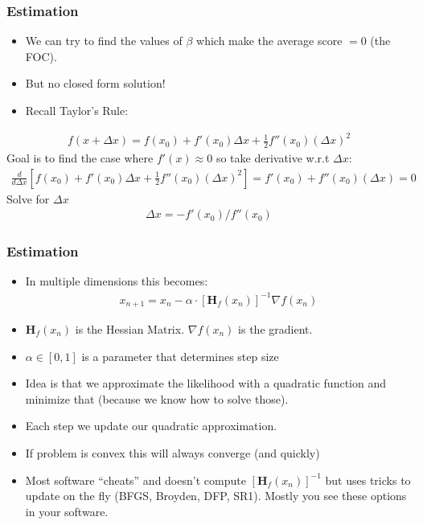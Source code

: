 \begin{frame}
\frametitle{Estimation}
\begin{itemize} 
\item We can try to find the values of $\beta$ which make the average score $=0$ (the FOC).
\item But no closed form solution!
\item Recall Taylor's Rule:
\end{itemize}
\begin{eqnarray*}
f(x + \Delta x) =  f(x_0) + f'(x_0) \Delta x + \frac{1}{2} f''(x_0) (\Delta x)^2
\end{eqnarray*}
Goal is to find the case where $f'(x) \approx 0$ so take derivative w.r.t $\Delta x$:
\begin{eqnarray*}
\frac{d}{d \Delta x} \left[  f(x_0) + f'(x_0) \Delta x + \frac{1}{2} f''(x_0) (\Delta x)^2 \right] = f'(x_0) +  f''(x_0) (\Delta x) = 0
\end{eqnarray*}
Solve for $\Delta x$
\begin{eqnarray*}
\Delta x  = - f'(x_0) / f''(x_0)
\end{eqnarray*}
\end{frame}



\begin{frame}
\frametitle{Estimation}
\begin{itemize} 
\item In multiple dimensions this becomes:
\begin{eqnarray*}
x_{n+1} = x_{n} - \alpha \cdot \left[\mathbf{H}_f (x_n) \right]^{-1} \nabla f(x_n)
\end{eqnarray*}
\item $\mathbf{H}_f (x_n)$ is the \alert{Hessian} Matrix. $ \nabla f(x_n)$ is the \alert{gradient}.
\item $\alpha \in [0,1]$ is a parameter that determines \alert{step size}
\item Idea is that we approximate the likelihood with a quadratic function and minimize that (because we know how to solve those).
\item Each step we update our quadratic approximation.
\item If problem is \alert{convex} this will always converge (and quickly)
\item Most software ``cheats'' and doesn't compute $\left[\mathbf{H}_f (x_n) \right]^{-1}$ but uses tricks to update on the fly (BFGS, Broyden, DFP, SR1). Mostly you see these options in your software.
\end{itemize}
\end{frame}


